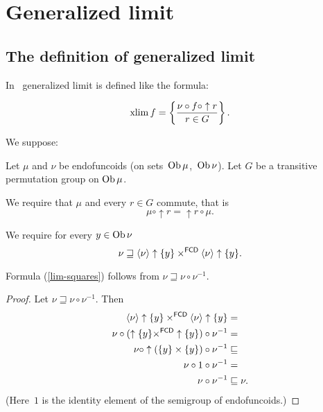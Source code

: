 \chapter{Generalized limit}

\section{The definition of generalized limit}

In~\cite{volume-1-edition1} generalized limit is defined like the formula:

\begin{equation}\label{xlim1}
\operatorname{xlim} f = \left\{ \frac{ \nu\circ f\circ \uparrow r}{r\in G}\right\}.
\end{equation}

We suppose:

Let $\mu$ and $\nu$ be endofuncoids (on sets~$\operatorname{Ob}\mu$,~$\operatorname{Ob}\nu$). Let $G$ be a transitive permutation
group on $\operatorname{Ob}\mu$.

We require that $\mu$ and every $r\in G$ commute, that is
\begin{equation}\label{commute}
\mu\circ\uparrow r=\uparrow r\circ\mu.
\end{equation}

We require for every $y\in\operatorname{Ob}\nu$ 
\begin{equation}\label{lim-squares}
\nu\sqsupseteq\left\langle \nu\right\rangle\uparrow\{y\}\times^{\mathsf{FCD}}\left\langle \nu\right\rangle\uparrow\{y\}.
\end{equation}

\begin{prop}
Formula (\ref{lim-squares}) follows from $\nu\sqsupseteq\nu\circ\nu^{-1}$.
\end{prop}

\begin{proof}
Let $\nu\sqsupseteq\nu\circ\nu^{-1}$. Then
\begin{align*}
\left\langle \nu\right\rangle\uparrow\{y\}\times^{\mathsf{FCD}}\left\langle \nu\right\rangle\uparrow\{y\} & =\\
\nu\circ(\uparrow\{y\}\times^{\mathsf{FCD}}\uparrow\{y\})\circ\nu^{-1} & =\\
\nu\circ\uparrow(\{y\}\times\{y\})\circ\nu^{-1} & \sqsubseteq\\
\nu\circ 1\circ\nu^{-1} & =\\
\nu\circ\nu^{-1} & \sqsubseteq\nu.
\end{align*}
(Here~$1$ is the identity element of the semigroup of endofuncoids.)
\end{proof}

